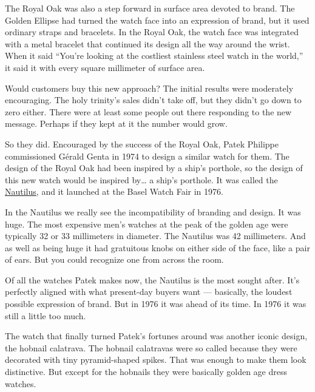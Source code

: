 \documentclass[12pt]{book}
\begin{document}
The Royal Oak was also a step forward in surface area devoted to brand.
The Golden Ellipse had turned the watch face into an expression of
brand, but it used ordinary straps and bracelets. In the Royal Oak, the
watch face was integrated with a metal bracelet that continued its
design all the way around the wrist. When it said ``You're looking at
the costliest stainless steel watch in the world,'' it said it with
every square millimeter of surface area.

Would customers buy this new approach? The initial results were
moderately encouraging. The holy trinity's sales didn't take off, but
they didn't go down to zero either. There were at least some people out
there responding to the new message. Perhaps if they kept at it the
number would grow.

So they did. Encouraged by the success of the Royal Oak, Patek Philippe
commissioned Gérald Genta in 1974 to design a similar watch for them.
The design of the Royal Oak had been inspired by a ship's porthole, so
the design of this new watch would be inspired by\ldots{} a ship's
porthole. It was called the
\href{https://www.sothebys.com/en/buy/auction/2025/important-watches-2/reference-3700-11-nautilus-jumbo-a-stainless-steel}{Nautilus},
and it launched at the Basel Watch Fair in 1976.

In the Nautilus we really see the incompatibility of branding and
design. It was huge. The most expensive men's watches at the peak of the
golden age were typically 32 or 33 millimeters in diameter. The Nautilus
was 42 millimeters. And as well as being huge it had gratuitous knobs on
either side of the face, like a pair of ears. But you could recognize
one from across the room.

Of all the watches Patek makes now, the Nautilus is the most sought
after. It's perfectly aligned with what present-day buyers want ---
basically, the loudest possible expression of brand. But in 1976 it was
ahead of its time. In 1976 it was still a little too much.

The watch that finally turned Patek's fortunes around was another iconic
design, the hobnail calatrava. The hobnail calatravas were so called
because they were decorated with tiny pyramid-shaped spikes. That was
enough to make them look distinctive. But except for the hobnails they
were basically golden age dress watches.
\end{document}

